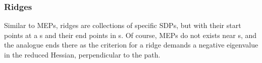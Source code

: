 
\subsubsection{Ridges}

Similar to MEPs, ridges are collections of specific SDPs, but with their start points at a s and their end points in s.
Of course, MEPs do not exists near s, and the analogue ends there as the criterion for a ridge demands a negative eigenvalue in the reduced Hessian, perpendicular to the path.

